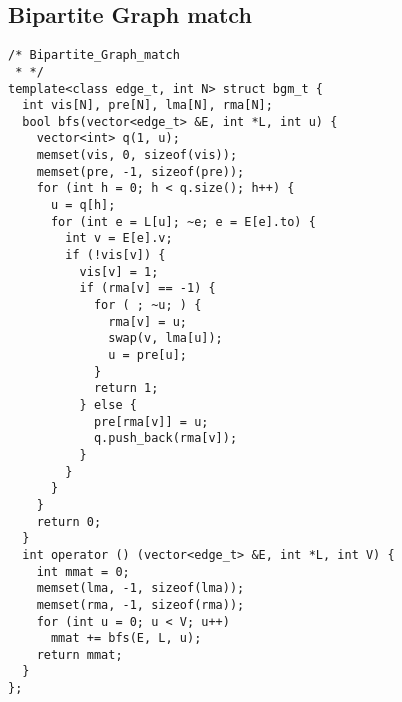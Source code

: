 \subsection{Bipartite Graph match}
\begin{lstlisting}
/* Bipartite_Graph_match
 * */
template<class edge_t, int N> struct bgm_t {
  int vis[N], pre[N], lma[N], rma[N];
  bool bfs(vector<edge_t> &E, int *L, int u) {
    vector<int> q(1, u);
    memset(vis, 0, sizeof(vis));
    memset(pre, -1, sizeof(pre));
    for (int h = 0; h < q.size(); h++) {
      u = q[h];
      for (int e = L[u]; ~e; e = E[e].to) {
        int v = E[e].v;
        if (!vis[v]) {
          vis[v] = 1;
          if (rma[v] == -1) {
            for ( ; ~u; ) {
              rma[v] = u;
              swap(v, lma[u]);
              u = pre[u];
            }
            return 1;
          } else {
            pre[rma[v]] = u;
            q.push_back(rma[v]);
          }
        }
      }
    }
    return 0;
  }
  int operator () (vector<edge_t> &E, int *L, int V) {
    int mmat = 0;
    memset(lma, -1, sizeof(lma));
    memset(rma, -1, sizeof(rma));
    for (int u = 0; u < V; u++)
      mmat += bfs(E, L, u);
    return mmat;
  }
};
\end{lstlisting}


